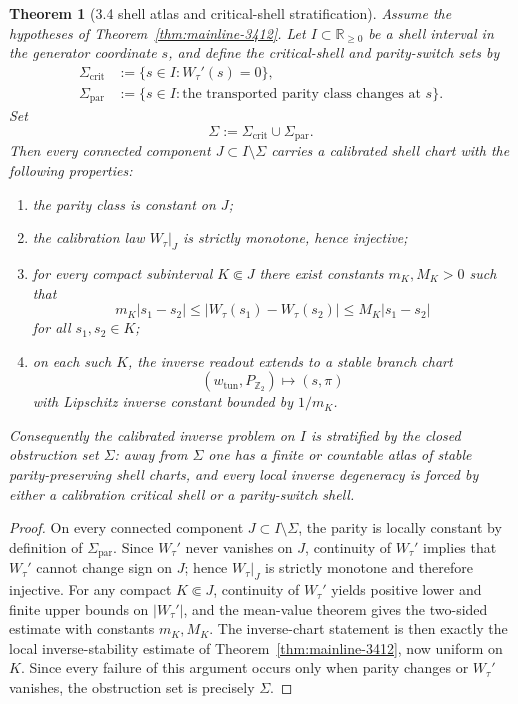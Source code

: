 \documentclass[12pt,a4paper]{article}
\newtheorem{theorem}{Theorem}[section]
\begin{document}
\begin{theorem}[3.4 shell atlas and critical-shell stratification]
\label{thm:mainline-3413}
Assume the hypotheses of Theorem~\ref{thm:mainline-3412}. Let $I\subset \mathbb R_{\ge 0}$ be a shell interval in the generator coordinate $s$, and define the critical-shell and parity-switch sets by
\[
\begin{aligned}
\Sigma_{\mathrm{crit}}&:=\{s\in I: W_\tau'(s)=0\},\\
\Sigma_{\mathrm{par}}&:=\{s\in I:\text{the transported parity class changes at }s\}.
\end{aligned}
\]
Set
\[
 \Sigma:=\Sigma_{\mathrm{crit}}\cup\Sigma_{\mathrm{par}}.
\]
Then every connected component $J\subset I\setminus \Sigma$ carries a calibrated shell chart with the following properties:
\begin{enumerate}[label=(\roman*)]
 \item the parity class is constant on $J$;
 \item the calibration law $W_\tau|_J$ is strictly monotone, hence injective;
 \item for every compact subinterval $K\Subset J$ there exist constants $m_K,M_K>0$ such that
 \[
 m_K|s_1-s_2|
 \le |W_\tau(s_1)-W_\tau(s_2)|
 \le M_K|s_1-s_2|
 \]
 for all $s_1,s_2\in K$;
 \item on each such $K$, the inverse readout extends to a stable branch chart
 \[
 (w_{\mathrm{tun}},P_{\mathbb Z_2})
 \longmapsto
 (s,\pi)
 \]
 with Lipschitz inverse constant bounded by $1/m_K$.
\end{enumerate}
Consequently the calibrated inverse problem on $I$ is stratified by the closed obstruction set $\Sigma$: away from $\Sigma$ one has a finite or countable atlas of stable parity-preserving shell charts, and every local inverse degeneracy is forced by either a calibration critical shell or a parity-switch shell.
\end{theorem}

\begin{proof}
On every connected component $J\subset I\setminus \Sigma$, the parity is locally constant by definition of $\Sigma_{\mathrm{par}}$. Since $W_\tau'$ never vanishes on $J$, continuity of $W_\tau'$ implies that $W_\tau'$ cannot change sign on $J$; hence $W_\tau|_J$ is strictly monotone and therefore injective. For any compact $K\Subset J$, continuity of $W_\tau'$ yields positive lower and finite upper bounds on $|W_\tau'|$, and the mean-value theorem gives the two-sided estimate with constants $m_K,M_K$. The inverse-chart statement is then exactly the local inverse-stability estimate of Theorem~\ref{thm:mainline-3412}, now uniform on $K$. Since every failure of this argument occurs only when parity changes or $W_\tau'$ vanishes, the obstruction set is precisely $\Sigma$.
\end{proof}
\end{document}
